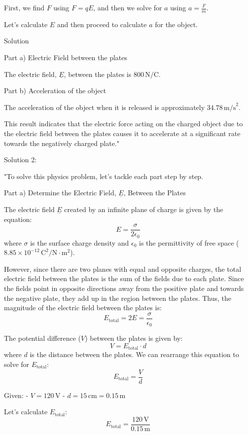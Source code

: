 First, we find \( F \) using \( F = qE \), and then we solve for \( a \) using \( a = \frac{F}{m} \).

Let's calculate \( E \) and then proceed to calculate \( a \) for the object.

Solution

Part a) Electric Field between the plates

The electric field, \( \underline{E} \), between the plates is \( 800 \, \text{N/C} \).

Part b) Acceleration of the object

The acceleration of the object when it is released is approximately \( 34.78 \, \text{m/s}^2 \). 

This result indicates that the electric force acting on the charged object due to the electric field between the plates causes it to accelerate at a significant rate towards the negatively charged plate."

Solution 2: 

"To solve this physics problem, let's tackle each part step by step.

Part a) Determine the Electric Field, \( \underline{E} \), Between the Plates

The electric field \( \underline{E} \) created by an infinite plane of charge is given by the equation:
\[ E = \frac{\sigma}{2 \epsilon_0} \]
where \( \sigma \) is the surface charge density and \( \epsilon_0 \) is the permittivity of free space (\( 8.85 \times 10^{-12} \, \text{C}^2/\text{N}\cdot\text{m}^2 \)).

However, since there are two planes with equal and opposite charges, the total electric field between the plates is the sum of the fields due to each plate. Since the fields point in opposite directions away from the positive plate and towards the negative plate, they add up in the region between the plates. Thus, the magnitude of the electric field between the plates is:
\[ E_{\text{total}} = 2E = \frac{\sigma}{\epsilon_0} \]

The potential difference (\( V \)) between the plates is given by:
\[ V = E_{\text{total}} \cdot d \]
where \( d \) is the distance between the plates. We can rearrange this equation to solve for \( E_{\text{total}} \):
\[ E_{\text{total}} = \frac{V}{d} \]

Given:
- \( V = 120 \, \text{V} \)
- \( d = 15 \, \text{cm} = 0.15 \, \text{m} \)

Let's calculate \( E_{\text{total}} \):
\[ E_{\text{total}} = \frac{120 \, \text{V}}{0.15 \, \text{m}} \]


